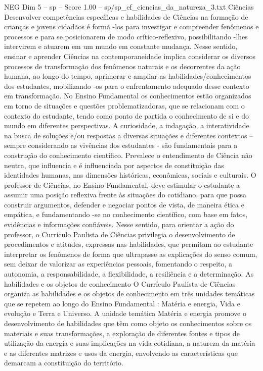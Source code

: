 \begin{textsample}{NEG Dim 5 – sp – Score 1.00 – sp/sp\_ef\_ciencias\_da\_natureza\_3.txt}  \label{ex:f5_neg_214}
Ciências Desenvolver competências específicas e habilidades de Ciências na formação de crianças e jovens cidadãos é formá -los para investigar e compreender fenômenos e processos e para se posicionarem de modo crítico-reflexivo, possibilitando -lhes intervirem e atuarem em um mundo em constante mudança.
Nesse sentido, ensinar e aprender Ciências na contemporaneidade implica considerar os diversos processos de transformação dos fenômenos naturais e os decorrentes da ação humana, ao longo do tempo, aprimorar e ampliar as habilidades/conhecimentos dos estudantes, mobilizando -os para o enfrentamento adequado desse contexto em transformação.
No Ensino Fundamental os conhecimentos estão organizados em torno de situações e questões problematizadoras, que se relacionam com o contexto do estudante, tendo como ponto de partida o conhecimento de si e do mundo em diferentes perspectivas.
A curiosidade, a indagação, a interatividade na busca de soluções e/ou respostas a diversas situações e diferentes contextos – sempre considerando as vivências dos estudantes - são fundamentais para a construção do conhecimento científico.
Prevalece o entendimento de Ciência não neutra, que influencia e é influenciada por aspectos de constituição das identidades humanas, nas dimensões históricas, econômicas, sociais e culturais.
O professor de Ciências, no Ensino Fundamental, deve estimular o estudante a assumir uma posição reflexiva frente às situações do cotidiano, para que possa construir argumentos, defender e negociar pontos de vista, de maneira ética e empática, e fundamentando -se no conhecimento científico, com base em fatos, evidências e informações confiáveis.
Nesse sentido, para orientar a ação do professor, o Currículo Paulista de Ciências privilegia o desenvolvimento de procedimentos e atitudes, expressas nas habilidades, que permitam ao estudante interpretar os fenômenos de forma que ultrapasse as explicações do senso comum, sem deixar de valorizar as experiências pessoais, fomentando o respeito, a autonomia, a responsabilidade, a flexibilidade, a resiliência e a determinação.
As habilidades e os objetos de conhecimento O Currículo Paulista de Ciências organiza as habilidades e os objetos de conhecimento em três unidades temáticas que se repetem ao longo do Ensino Fundamental : Matéria e energia, Vida e evolução e Terra e Universo.
A unidade temática Matéria e energia promove o desenvolvimento de habilidades que têm como objeto os conhecimentos sobre os materiais e suas transformações, a exploração de diferentes fontes e tipos de utilização da energia e suas implicações na vida cotidiana, a natureza da matéria e as diferentes matrizes e usos da energia, envolvendo as características que demarcam a constituição do território.

\end{textsample}
